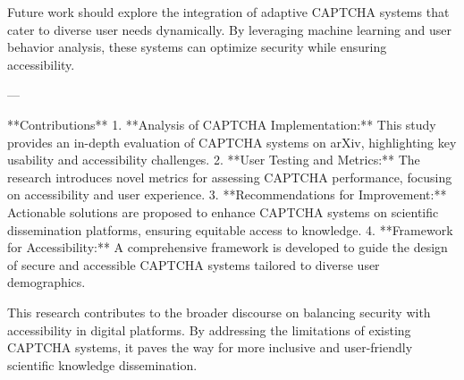Future work should explore the integration of adaptive CAPTCHA systems that cater to diverse user needs dynamically. By leveraging machine learning and user behavior analysis, these systems can optimize security while ensuring accessibility.

---

**Contributions**  
1. **Analysis of CAPTCHA Implementation:** This study provides an in-depth evaluation of CAPTCHA systems on arXiv, highlighting key usability and accessibility challenges.  
2. **User Testing and Metrics:** The research introduces novel metrics for assessing CAPTCHA performance, focusing on accessibility and user experience.  
3. **Recommendations for Improvement:** Actionable solutions are proposed to enhance CAPTCHA systems on scientific dissemination platforms, ensuring equitable access to knowledge.  
4. **Framework for Accessibility:** A comprehensive framework is developed to guide the design of secure and accessible CAPTCHA systems tailored to diverse user demographics.

This research contributes to the broader discourse on balancing security with accessibility in digital platforms. By addressing the limitations of existing CAPTCHA systems, it paves the way for more inclusive and user-friendly scientific knowledge dissemination.